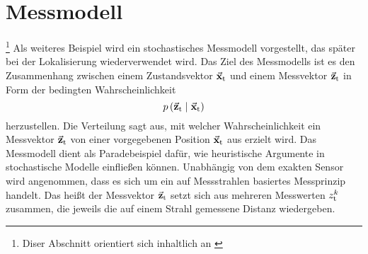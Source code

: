 \section{Messmodell}\footnote{Diser Abschnitt orientiert sich inhaltlich an \cite[S. 153 ff]{ProbRob}}
Als weiteres Beispiel wird ein stochastisches Messmodell vorgestellt, das später bei der Lokalisierung wiederverwendet wird. Das Ziel des Messmodells ist es den Zusammenhang zwischen einem Zustandsvektor $\vec{\mathbf{x}}_{\text{t}}$ und einem Messvektor $\vec{\mathbf{z}}_{\text{t}}$ in Form der bedingten Wahrscheinlichkeit
\begin{equation}
p\left({\vec{\mathbf{z}}_{\text{t}}} \hspace{1mm} \vert \hspace{1mm} {\vec{\mathbf{x}}_{\text{t}}}\right)
\end{equation}
herzustellen. Die Verteilung sagt aus, mit welcher Wahrscheinlichkeit ein Messvektor $\vec{\mathbf{z}}_{\text{t}}$ von einer vorgegebenen Position $\vec{\mathbf{x}}_{\text{t}}$ aus erzielt wird. Das Messmodell dient als Paradebeispiel dafür, wie heuristische Argumente in stochastische Modelle einfließen können. Unabhängig von dem exakten Sensor wird angenommen, dass es sich um ein auf Messstrahlen basiertes Messprinzip handelt. Das heißt der Messvektor $\vec{\mathbf{z}}_{\text{t}}$ setzt sich aus mehreren Messwerten $z^k_{\text{t}}$ zusammen, die jeweils die auf einem Strahl gemessene Distanz wiedergeben. 

